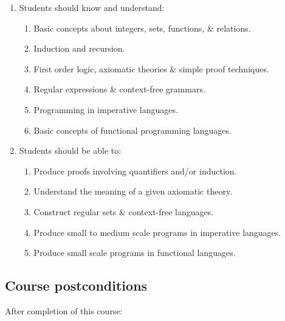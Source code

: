 \documentclass[11pt]{article}
\begin{document}
\begin{enumerate}
\item Students should know and understand:
\begin{enumerate}
\item Basic concepts about integers, sets, functions, \& relations.
\item Induction and recursion.
\item First order logic, axiomatic theories \& simple proof techniques.
\item Regular expressions \& context-free grammars.
\item Programming in imperative languages.
\item Basic concepts of functional programming languages.
\end{enumerate}
\item Students should be able to:
\begin{enumerate}
\item Produce proofs involving quantifiers and/or induction.
\item Understand the meaning of a given axiomatic theory.
\item Construct regular sets \& context-free languages.
\item Produce small to medium scale programs in imperative languages.
\item Produce small scale programs in functional languages.
\end{enumerate}
\end{enumerate}

\subsection{Course postconditions}
\label{sec:org9a3cf4a}
After completion of this course:
\end{document}
